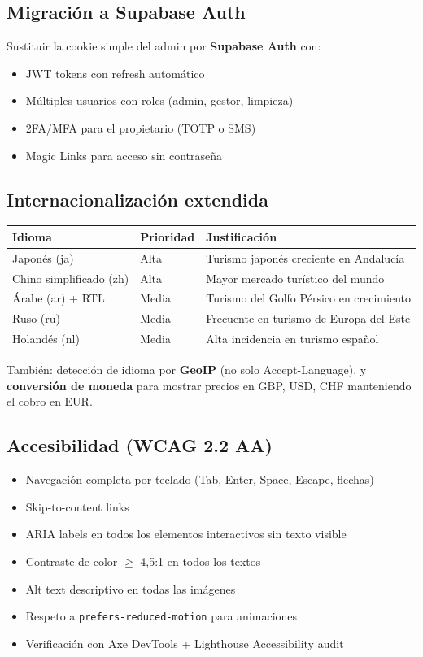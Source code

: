 \documentclass[12pt,a4paper,twoside,openright]{report}
\begin{document}
\subsection{Migración a Supabase Auth}

Sustituir la cookie simple del admin por \textbf{Supabase Auth} con:
\begin{itemize}
  \item JWT tokens con refresh automático
  \item Múltiples usuarios con roles (admin, gestor, limpieza)
  \item 2FA/MFA para el propietario (TOTP o SMS)
  \item Magic Links para acceso sin contraseña
\end{itemize}

\subsection{Internacionalización extendida}

\begin{longtable}{L{4cm} C{2.5cm} L{6cm}}
  \toprule
  \textbf{Idioma} & \textbf{Prioridad} & \textbf{Justificación} \\
  \midrule
  Japonés (ja) & Alta & Turismo japonés creciente en Andalucía \\
  Chino simplificado (zh) & Alta & Mayor mercado turístico del mundo \\
  Árabe (ar) + RTL & Media & Turismo del Golfo Pérsico en crecimiento \\
  Ruso (ru) & Media & Frecuente en turismo de Europa del Este \\
  Holandés (nl) & Media & Alta incidencia en turismo español \\
  \bottomrule
\end{longtable}

También: detección de idioma por \textbf{GeoIP} (no solo Accept-Language),
y \textbf{conversión de moneda} para mostrar precios en GBP, USD, CHF manteniendo
el cobro en EUR.

\subsection{Accesibilidad (WCAG 2.2 AA)}

\begin{itemize}
  \item Navegación completa por teclado (Tab, Enter, Space, Escape, flechas)
  \item Skip-to-content links
  \item ARIA labels en todos los elementos interactivos sin texto visible
  \item Contraste de color $\geq$ 4,5:1 en todos los textos
  \item Alt text descriptivo en todas las imágenes
  \item Respeto a \texttt{prefers-reduced-motion} para animaciones
  \item Verificación con Axe DevTools + Lighthouse Accessibility audit
\end{itemize}
\end{document}
